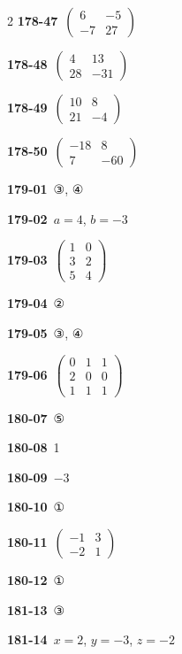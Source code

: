 \documentclass[10pt,a4paper]{article}
\begin{document}
\begin{multicols}{2}
\noindent\textbf{178-47}\ $\begin{pmatrix} 6 & -5 \\ -7 & 27 \end{pmatrix}$\par
\noindent\textbf{178-48}\ $\begin{pmatrix} 4 & 13 \\ 28 & -31 \end{pmatrix}$\par
\noindent\textbf{178-49}\ $\begin{pmatrix} 10 & 8 \\ 21 & -4 \end{pmatrix}$\par
\noindent\textbf{178-50}\ $\begin{pmatrix} -18 & 8 \\ 7 & -60 \end{pmatrix}$\par
\noindent\textbf{179-01}\ ③, ④\par
\noindent\textbf{179-02}\ $a=4$, $b=-3$\par
\noindent\textbf{179-03}\ $\begin{pmatrix} 1 & 0 \\ 3 & 2 \\ 5 & 4 \end{pmatrix}$\par
\noindent\textbf{179-04}\ ②\par
\noindent\textbf{179-05}\ ③, ④\par
\noindent\textbf{179-06}\ $\begin{pmatrix} 0 & 1 & 1 \\ 2 & 0 & 0 \\ 1 & 1 & 1 \end{pmatrix}$\par
\noindent\textbf{180-07}\ ⑤\par
\noindent\textbf{180-08}\ 1\par
\noindent\textbf{180-09}\ $-3$\par
\noindent\textbf{180-10}\ ①\par
\noindent\textbf{180-11}\ $\begin{pmatrix} -1 & 3 \\ -2 & 1 \end{pmatrix}$\par
\noindent\textbf{180-12}\ ①\par
\noindent\textbf{181-13}\ ③\par
\noindent\textbf{181-14}\ $x=2$, $y=-3$, $z=-2$\par

\end{multicols}
\end{document}
